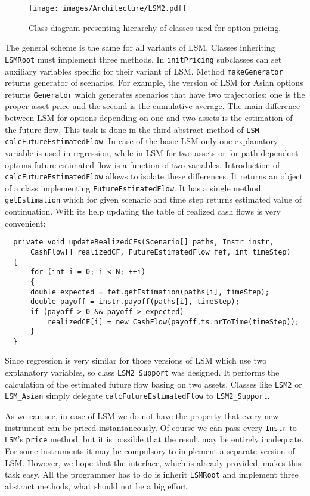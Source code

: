 \documentclass[a4paper,11pt, twoside]{book}
\theoremstyle{definition}
\theoremstyle{remark}
\newcounter{example}[chapter]
\begin{document}
\begin{figure}
\centering
 \texttt{[image: images/Architecture/LSM2.pdf]}
\caption{Class diagram presenting hierarchy of classes used for option pricing.}
\label{fig:arch:LSM}
\end{figure}
\newpage

The general scheme is the same for all variants of LSM. Classes inheriting \texttt{LSMRoot} must implement three methods. In \texttt{initPricing} subclasses can set auxiliary variables specific for their variant of LSM. Method \texttt{makeGenerator} returns generator of scenarios. For example, the version of LSM for Asian options returns \texttt{Generator} which generates scenarios that have two trajectories: one is the proper asset price and the second is the cumulative average. The main difference between LSM for options depending on one and two assets is the estimation of the future flow. This task is done in the third abstract method of \texttt{LSM} -- \texttt{calcFutureEstimatedFlow}. In case of the basic LSM only one explanatory variable is used in regression, while in LSM for two assets or for path-dependent options future estimated flow is a function of two variables. Introduction of \texttt{calcFutureEstimatedFlow} allows to isolate these differences. It returns an object of a class implementing \texttt{FutureEstimatedFlow}. It has a single method \texttt{getEstimation} which for given scenario and time step returns estimated value of continuation. With its help updating the table of realized cash flows is very convenient:
\begin{lstlisting}
  private void updateRealizedCFs(Scenario[] paths, Instr instr,
      CashFlow[] realizedCF, FutureEstimatedFlow fef, int timeStep)
  {
      for (int i = 0; i < N; ++i)
      {
	  double expected = fef.getEstimation(paths[i], timeStep);
	  double payoff = instr.payoff(paths[i], timeStep);
	  if (payoff > 0 && payoff > expected)
	      realizedCF[i] = new CashFlow(payoff,ts.nrToTime(timeStep));
      }
  }
\end{lstlisting}

Since regression is very similar for those versions of LSM which use two explanatory variables, so class \texttt{LSM2\_Support} was designed. It performs the calculation of the estimated future flow basing on two assets. Classes like \texttt{LSM2} or \texttt{LSM\_Asian} simply delegate \texttt{calcFutureEstimatedFlow} to \texttt{LSM2\_Support}.
   
As we can see, in case of LSM we do not have the property that every new instrument can be priced instantaneously. Of course we can pass every \texttt{Instr} to \texttt{LSM}'s \texttt{price} method, but it is possible that the result may be entirely inadequate. For some instruments it may be compulsory to implement a separate version of LSM. However, we hope that the interface, which is already provided, makes this task easy. All the programmer has to do is inherit \texttt{LSMRoot} and implement three abstract methods, what should not be a big effort.
\end{document}
